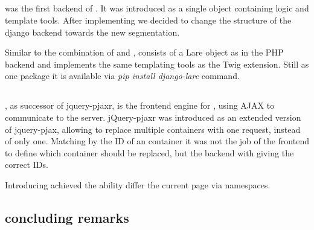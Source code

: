 \subsection{\djangoLare{}}

\djangoLare{} was the first backend of \lare{}.
It was introduced as a single object containing logic and template tools.
After implementing \phpLare{} we decided to change the structure of the django backend towards the new segmentation.

Similar to the combination of \phpLare{} and \twigLare{}, \djangoLare{} consists of a Lare object as in the PHP backend and implements the same templating tools as the Twig extension.
Still as one package it is available via \emph{pip install django-lare} command.

\subsection{\lareJS{}}
\lareJS{}, as successor of jquery-pjaxr, is the frontend engine for \lare{}, using AJAX to communicate to the server.
jQuery-pjaxr was introduced as an extended version of jquery-pjax, allowing to replace multiple containers with one request, instead of only one.
Matching by the ID of an container it was not the job of the frontend to define which container should be replaced, but the backend with giving the correct IDs.

Introducing \lareJS{} achieved the ability differ the current page via namespaces.


\subsection{concluding remarks}
